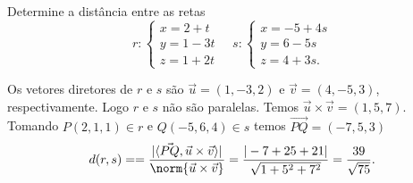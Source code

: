 \begin{exemplo}
    Determine a distância entre as retas
    \[
        r: \begin{cases}
            x = 2 + t\\
            y = 1 - 3t\\
            z = 1 + 2t
        \end{cases} \quad s: \begin{cases}
            x = -5 + 4s\\
            y = 6 - 5s\\
            z = 4 + 3s.
        \end{cases}
    \]
    \begin{solucao}
        Os vetores diretores de $r$ e $s$ são $\vec{u} = (1,-3,2)$ e $\vec{v} = (4,-5,3)$, respectivamente. Logo $r$ e $s$ não são paralelas.
        Temos $\vec{u}\times\vec{v} = (1,5,7)$. Tomando $P(2,1,1) \in r$ e $Q(-5,6,4) \in s$ temos $\vec{PQ} = (-7,5,3)$
        \[
            d(r,s) = = \dfrac{|\langle\vec{PQ},\vec{u}\times\vec{v}\rangle|}{\norm{\vec{u}\times\vec{v}}} = \dfrac{|-7+25+21|}{\sqrt{1 + 5^2 + 7^2}} = \dfrac{39}{\sqrt{75}}.
        \]


    \end{solucao}
\end{exemplo}

